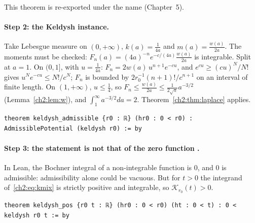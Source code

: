 This theorem is re-exported under the name  (Chapter~5).

\paragraph{Step 2: the Keldysh instance.} Take Lebesgue measure on $(0,+\infty)$, $k(a)=\frac1{4a}$ and
$m(a)=\frac{w(a)}{2a}$. The moments must be checked: $F_n(a)=(4a)^{-n}e^{-c/(4a)}\frac{w(a)}{2a}$ is integrable.
Split at $a=1$. On $(0,1]$, with $u=\frac1{4a}$: $F_n=2w(a)\,u^{n+1}e^{-cu}$, and $e^{cu}\ge(cu)^N/N!$ gives
$u^Ne^{-cu}\le N!/c^N$; $F_n$ is bounded by $2r_0^{-1}(n+1)!/c^{n+1}$ on an interval of finite length. On
$(1,+\infty)$, $u\le\frac14$, so $F_n\le\frac{w(a)}{2a}\le\frac1{2\sqrt\pi}a^{-3/2}$ (Lemma~\ref{ch2:lem:w}), and
$\int_1^\infty a^{-3/2}da=2$. Theorem~\ref{ch2:thm:laplace} applies.
\begin{leanbox}
\begin{lstlisting}[style=chdeux]
theorem keldysh_admissible {r0 : ℝ} (hr0 : 0 < r0) : AdmissiblePotential (keldysh r0) := by
\end{lstlisting}
\end{leanbox}

\paragraph{Step 3: the statement is not that of the zero function \tierA.} In Lean, the Bochner integral of a
non-integrable function is $0$, and $0$ is admissible: admissibility alone could be vacuous. But for $t>0$
the integrand of~\eqref{ch2:eq:kmix} is strictly positive and integrable, so $\mathcal K_{r_0}(t)>0$.
\begin{leanbox}
\begin{lstlisting}[style=chdeux]
theorem keldysh_pos {r0 t : ℝ} (hr0 : 0 < r0) (ht : 0 < t) : 0 < keldysh r0 t := by
\end{lstlisting}
\end{leanbox}

